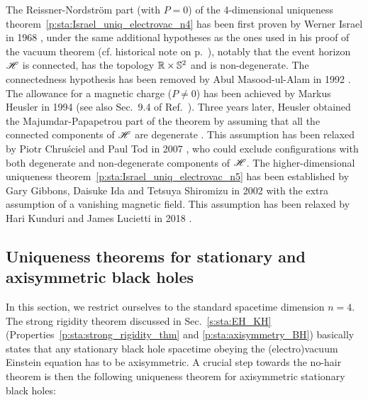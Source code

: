 \begin{hist}
\label{h:sta:Israel_thm_electrovac}
The Reissner-Nordström part (with $P=0$)
of the 4-dimensional uniqueness theorem~\ref{p:sta:Israel_uniq_electrovac_n4}
has been first proven by Werner Israel
in 1968 \cite{Israe68},
under the same additional hypotheses as the ones used in his proof of the vacuum
theorem (cf. historical note on p.~\pageref{h:sta:Israel_thm_vacuum}), notably
that the event horizon $\mathscr{H}$ is connected, has the topology $\mathbb{R}\times\mathbb{S}^2$ and is non-degenerate.
The connectedness hypothesis has been removed by
Abul Masood-ul-Alam in 1992 \cite{Masoo92}.
The allowance for a magnetic charge ($P\neq 0$) has been achieved by Markus Heusler in 1994 \cite{Heusl94} (see also Sec.~9.4 of Ref.~\cite{Heusl96}).
Three years later, Heusler obtained the Majumdar-Papapetrou part of the theorem
by assuming that all the connected components of $\mathscr{H}$ are degenerate \cite{Heusl97}.
This assumption has been relaxed by
Piotr Chru\'sciel and Paul Tod
in 2007 \cite{ChrusT07}, who could exclude configurations with both degenerate
and non-degenerate components of $\mathscr{H}$.
The higher-dimensional uniqueness theorem~\ref{p:sta:Israel_uniq_electrovac_n5}
has been established by Gary Gibbons, Daisuke Ida
and Tetsuya Shiromizu in 2002 \cite{GibboIS02a}
with the extra assumption of a vanishing magnetic field. This assumption
has been relaxed by Hari Kunduri and James Lucietti
in 2018 \cite{KunduL18}.
\end{hist}



\subsection{Uniqueness theorems for stationary and axisymmetric black holes}
\label{s:sta:uniqueness_axisym}

In this section, we restrict ourselves to the standard spacetime dimension $n=4$.
The strong rigidity theorem discussed in Sec.~\ref{s:sta:EH_KH} (Properties~\ref{p:sta:strong_rigidity_thm} and \ref{p:sta:axisymmetry_BH})
basically states that any stationary black hole spacetime obeying the (electro)vacuum Einstein
equation has to be axisymmetric.
A crucial step towards the no-hair theorem is then the following uniqueness theorem
for axisymmetric stationary black holes:


